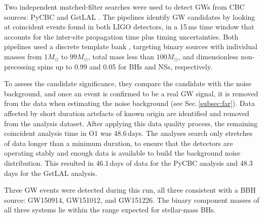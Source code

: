 \documentclass[binding=0.6cm, LaM]{sapthesis}
\begin{document}
	Two independent matched-filter searches were used to detect GWs from CBC sources: 
	{\ttfamily PyCBC} \cite{109, 110, 111, 112} and {\ttfamily GstLAL} \cite{112, 113, 114}.
	The pipelines identify GW candidates by looking at coincident events 
	found in both LIGO detectors, in a 15\,ms time window 
	that accounts for the inter-site propagation time plus timing uncertainties. 
	Both pipelines used a discrete template bank \cite{42, 114, 115, 117, 118, 119, 120}, 
	targeting binary sources with individual masses from $1{M_\odot}$ to $99{M_\odot}$,
	total mass less than $100{M_\odot}$, and dimensionless non-precessing spins up to 0.99 and 0.05 for BHs and NSs, respectively.

	To assess the candidate significance, they compare the candidate with the noise background, 
	and once an event is confirmed to be a real GW signal, 
	it is removed from the data when estimating the noise background (see Sec.\,\ref{subsec:far}).
	Data affected by short duration artefacts of known origin are identified and removed from the analysis dataset.
	After applying this data quality process, the remaining coincident analysis time in O1 was 48.6\,days. 
	The analyses search only stretches of data longer than a minimum duration, 
	to ensure that the detectors are operating stably and enough data is available to build the background noise distribution.
	This resulted in 46.1\,days of data for the {\ttfamily PyCBC} analysis and 48.3\,days for the {\ttfamily GstLAL} analysis.

	Three GW events were detected during this run, all three consistent with a BBH source: GW150914, GW151012, and GW151226.
	The binary component masses of all three systems lie 
	within the range expected for stellar-mass BHs. 
\end{document}
